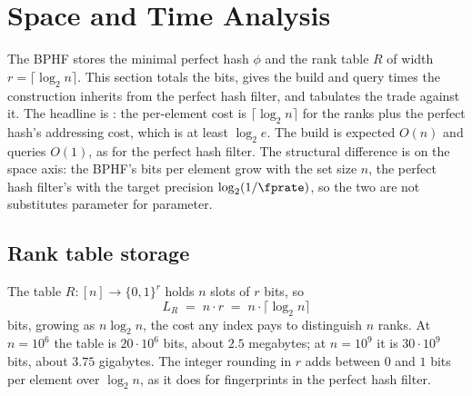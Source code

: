 %

\section{Space and Time Analysis}
\label{sec:space-time-analysis}

The BPHF stores the minimal perfect hash $\phi$ and the rank table $R$ of
width $r = \lceil \log_2 n \rceil$. This section totals the bits, gives
the build and query times the construction inherits from the perfect hash
filter, and tabulates the trade against it. The headline is
: the per-element cost is $\lceil \log_2 n \rceil$
for the ranks plus the perfect hash's addressing cost, which is at least
$\log_2 e$. The build is expected $O(n)$ and queries $O(1)$, as for the
perfect hash filter. The structural difference is on the space axis: the
BPHF's bits per element grow with the set size $n$, the perfect hash
filter's with the target precision $\log_2(1/\fprate)$, so the two are
not substitutes parameter for parameter.

\subsection*{Rank table storage}

The table $R : [n] \to \{0, 1\}^r$ holds $n$ slots of $r$ bits, so
\begin{equation}
\label{eq:bphf-rank-bits}
  L_R \;=\; n \cdot r \;=\; n \cdot \lceil \log_2 n \rceil
\end{equation}
bits, growing as $n \log_2 n$, the cost any index pays to distinguish
$n$ ranks. At $n = 10^6$ the table is $20 \cdot 10^6$ bits, about $2.5$
megabytes; at $n = 10^9$ it is $30 \cdot 10^9$ bits, about $3.75$
gigabytes. The integer rounding in $r$ adds between $0$ and $1$ bits per
element over $\log_2 n$, as it does for fingerprints in the perfect hash
filter.

